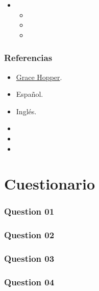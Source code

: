 \documentclass[a4paper,12pt]{man_cv}
\begin{document}
\begin{itemize}
  \item \lipsum[8][5]
        \begin{itemize}
          \item \lipsum[8][6]
          \item \lipsum[8][7]
          \item \lipsum[8][8]
        \end{itemize}
\end{itemize}
\subsubsection*{Referencias}
\begin{itemize}
  \item \href{https://www.linkedin.com/in/}{Grace Hopper}.
\end{itemize}


\CVIdiomas
\begin{itemize}
  \item Español.
  \item Inglés.
\end{itemize}

\CVMiscelanea
\begin{itemize}
  \item \lipsum[8][9]
  \item \lipsum[8][10]
  \item \lipsum[8][11]
\end{itemize}

\pagebreak

\thispagestyle{body}

\section*{Cuestionario}

\subsubsection*{Question 01}
\lipsum[9-11]

\subsubsection*{Question 02}
\lipsum[11-12]

\subsubsection*{Question 03}
\lipsum[12-14]

\subsubsection*{Question 04}
\lipsum[13-15]
\end{document}
